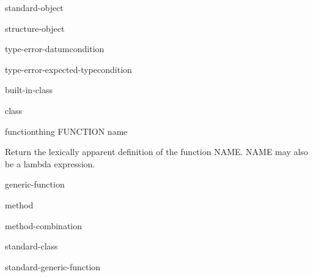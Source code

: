 \begin{class}{standard-object}{}
  
\end{class}

\begin{class}{structure-object}{}
  
\end{class}

\begin{function}{type-error-datum}{condition}
  
\end{function}

\begin{function}{type-error-expected-type}{condition}
  
\end{function}

\begin{class}{built-in-class}{}
  
\end{class}

\begin{class}{class}{}
  
\end{class}

\begin{class}{function}{thing}
  FUNCTION name

Return the lexically apparent definition of the function NAME. NAME may also
be a lambda expression.
\end{class}

\begin{class}{generic-function}{}
  
\end{class}

\begin{class}{method}{}
  
\end{class}

\begin{class}{method-combination}{}
  
\end{class}

\begin{class}{standard-class}{}
  
\end{class}

\begin{class}{standard-generic-function}{}
  
\end{class}

